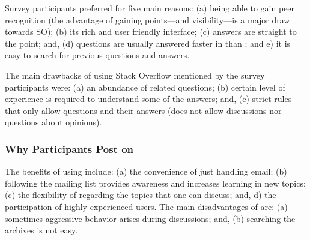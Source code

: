 Survey participants preferred \SO for five main reasons: (a) being able to gain peer recognition (the advantage of gaining points---and visibility---is a major draw towards SO); (b) its rich and user friendly interface; (c) answers are straight to the point; and, (d) questions are usually answered faster in \SO than \RH; and e) it is easy to search for previous questions and answers.

The main drawbacks of using Stack Overflow mentioned by the survey participants were: (a) an abundance of related questions; (b) certain level of experience is required to understand some of the answers; and, (c) \SO strict rules that only allow questions and their answers (\SO does not allow discussions nor questions about opinions).


\subsubsection{Why Participants Post on \RH}
\label{sec:rh}

The benefits of using \RH include: (a) the convenience of just handling email; (b)  following the mailing list provides awareness and increases learning in new topics; (c) the flexibility of \RH regarding the topics that one can discuss; and, d) the participation of highly experienced users. The main disadvantages of \RH are: (a) sometimes aggressive behavior arises during discussions; and, (b) searching the archives is not easy.


